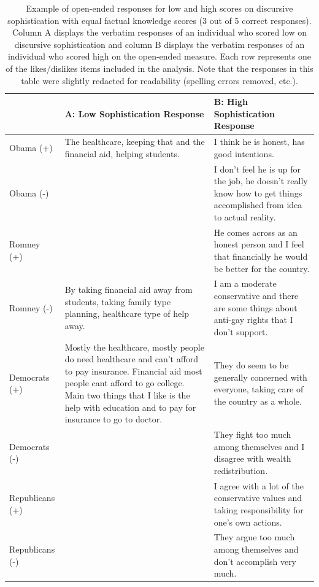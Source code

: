 \documentclass[12pt]{article}
\begin{document}
\begin{table}[ht]\footnotesize\centering
\begin{tabular}{l|p{6.5cm}|p{6.5cm}}
   \toprule
  & A: Low Sophistication Response & B: High Sophistication Response \\ 
   \midrule
   Obama (+) & The healthcare, keeping that and the financial aid, helping students. & I think he is honest, has good intentions. \\ \hdashline
     Obama (-) &  & I don't feel he is up for the job, he doesn't really know how to get things accomplished from idea to actual reality. \\ \hdashline
     Romney (+) &  & He comes across as an honest person and I feel that financially he would be better for the country. \\ \hdashline
     Romney (-) & By taking financial aid away from students, taking family type planning, healthcare type of help away. & I am a moderate conservative and there are some things about anti-gay rights that I don't support. \\ \hdashline
     Democrats (+) & Mostly the healthcare, mostly people do need healthcare and can't afford to pay insurance. Financial aid most people cant afford to go college. Main two things that I like is the help with education and to pay for insurance to go to doctor. & They do seem to be generally concerned with everyone, taking care of the country as a whole. \\ \hdashline
     Democrats (-) &  & They fight too much among themselves and I disagree with wealth redistribution. \\ \hdashline
     Republicans (+) &  & I agree with a lot of the conservative values and taking responsibility for one's own actions. \\ \hdashline
     Republicans (-) &  & They argue too much among themselves and don't accomplish very much. \\ 
    \bottomrule
 \end{tabular}
\caption{Example of open-ended responses for low and high scores on discursive sophistication with equal factual knowledge scores (3 out of 5 correct responses). Column A displays the verbatim responses of an individual who scored low on discursive sophistication and column B displays the verbatim responses of an individual who scored high on the open-ended measure. Each row represents one of the likes/dislikes items included in the analysis. Note that the responses in this table were slightly redacted for readability (spelling errors removed, etc.).}\label{tab:ex1}
\end{table}
\end{document}
